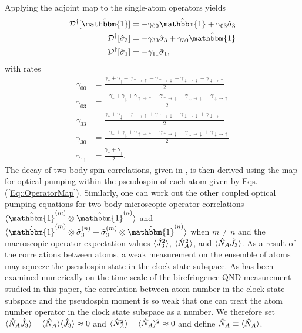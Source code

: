 \documentclass[aps,pra,twocolumn]{revtex4-1} %
\newcommand{\NA}{\tilde{N}_A}
\newcommand{\gammauu}{\gamma_{\uparrow \rightarrow \uparrow}}
\newcommand{\gammadd}{\gamma_{\downarrow \rightarrow \downarrow}}
\newcommand{\gammaud}{\gamma_{\uparrow \rightarrow \downarrow}}
\newcommand{\gammadu}{\gamma_{\downarrow \rightarrow \uparrow}}
\begin{document}
\begin{appendix}
Applying the adjoint map to the single-atom operators yields 
	\begin{subequations} \label{Eq::OperatorMap}
	\begin{align}
		\mathcal{D}\dg[\hat{\mathbbm{1}}] & = - \gamma_{00} \hat{\mathbbm{1}} +\gamma_{03} \hat{\sigma}_3 \label {Eq::Idecay} \\
		\mathcal{D}\dg[\hat{\sigma}_3] & =- \gamma_{33} \hat{\sigma}_3 +  \gamma_{30} \hat{\mathbbm{1}} 
\label{Eq::zdecay} \\
		\mathcal{D}\dg[\hat{\sigma}_1] & = - \gamma_{11} \hat{\sigma}_1\label{Eq::xdecay},
	\end{align}
	\end{subequations}
with rates	
	\begin{subequations} \label{Eq::DecayRates}
	\begin{align}
		\gamma_{00} 
			& = \frac{\gamma_{\uparrow}+\gamma_{\downarrow} - \gammauu-\gammaud  -\gammadd-\gammadu}{2} \\
			\gamma_{03} 
			& = \frac{-\gamma_{\uparrow}+\gamma_{\downarrow} +\gammauu + \gammaud - \gammadd - \gammadu }{2}\\		
		\gamma_{33} 
			& = \frac{\gamma_{\uparrow}+\gamma_{\downarrow} - \gammauu+\gammaud  -\gammadd+\gammadu}{2}\\
			\gamma_{30} 
			& = \frac{-\gamma_{\uparrow} + \gamma_{\downarrow} + \gammauu - \gammaud - \gammadd + \gammadu }{2} \\
			\gamma_{11} 
			& = \frac{\gamma_{\uparrow}+\gamma_{\downarrow}}{2}. \label{Eq::frate}
	\end{align}
	\end{subequations}
The decay of two-body spin correlations, given in , is then derived using the map for optical pumping within the pseudospin of each atom given by Eqs. (\ref{Eq::OperatorMap}).  
Similarly, one can work out the other coupled optical pumping equations for two-body microscopic operator correlations $ \expt{\hat{\mathbbm{1}}^{(m)} \otimes \hat{\mathbbm{1}}^{(n)}} $ and $ \expt{\hat{\mathbbm{1}}^{(m)} \otimes \hat{\sigma}_3^{(n)} + \hat{\sigma}_3^{(m)} \otimes \hat{\mathbbm{1}}^{(n)} } $ when $ m\neq n $ and the macroscopic operator expectation values $ \langle{\hat{J}_3^2}\rangle $, $ \langle{\hat{N}_A^2}\rangle $, and $ \langle{\hat{N}_A\hat{J}_3}\rangle $. 
As a result of the correlations between atoms, a weak measurement on the ensemble of atoms may squeeze the pseudospin state in the clock state subspace. 
As has been examined numerically on the time scale of the birefringence QND measurement studied in this paper, the correlation between atom number in the clock state subspace and the pseudospin moment is so weak that one can treat the atom number operator in the clock state subspace as a number.
We therefore set $ \langle{\hat{N}_A\hat{J}_3}\rangle-\langle{\hat{N}_A}\rangle\langle{\hat{J}_3}\rangle\approx 0 $ and $ \langle{\hat{N}_A^2}\rangle - \langle{\hat{N}_A}\rangle^2 \approx 0 $ and define $ \NA\equiv \expt{\hat{N}_A}$. 


\end{appendix}
\end{document}
